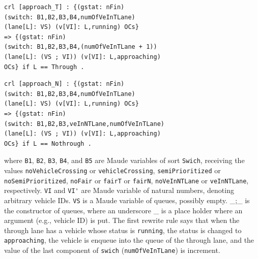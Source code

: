 \documentclass[10pt, conference, compsocconf]{IEEEtran}
\begin{document}
\begin{small}
\begin{verbatim}
crl [approach_T] : {(gstat: nFin) 
(switch: B1,B2,B3,B4,numOfVeInTLane) 
(lane[L]: VS) (v[VI]: L,running) OCs} 
=> {(gstat: nFin) 
(switch: B1,B2,B3,B4,(numOfVeInTLane + 1)) 
(lane[L]: (VS ; VI)) (v[VI]: L,approaching) 
OCs} if L == Through .
\end{verbatim}
\end{small}
\begin{small}
\begin{verbatim}
crl [approach_N] : {(gstat: nFin) 
(switch: B1,B2,B3,B4,numOfVeInTLane) 
(lane[L]: VS) (v[VI]: L,running) OCs} 
=> {(gstat: nFin) 
(switch: B1,B2,B3,veInNTLane,numOfVeInTLane) 
(lane[L]: (VS ; VI)) (v[VI]: L,approaching) 
OCs} if L == Nothrough .
\end{verbatim}
\end{small}

\noindent 
where \verb!B1!, \verb!B2!, \verb!B3!, \verb!B4!, and \verb!B5! are Maude variables of sort \verb!Swich!, receiving the values \verb!noVehicleCrossing! or \verb!vehicleCrossing!, \verb!semiPrioritized! or \verb!noSemiPrioritized!, \verb!noFair! or \verb!fairT! or \verb!fairN!, \verb!noVeInNTLane! or \verb!veInNTLane!, respectively.
\verb!VI! and \verb!VI'! are Maude variable of natural numbers, denoting arbitrary vehicle IDs. 
\verb!VS! is a Maude variable of queues, possibly empty.
\_;\_ is the constructor of queues, where an underscore \_ is
a place holder where an argument (e.g., vehicle ID) is put. 
The first rewrite rule says that when the through lane has a vehicle whose status is \verb!running!, the status is changed to \verb!approaching!, the vehicle is enqueue into the queue of the through lane, and the value of the last component of \verb!swich! (\verb!numOfVeInTLane!) is increment.
%
\end{document}
